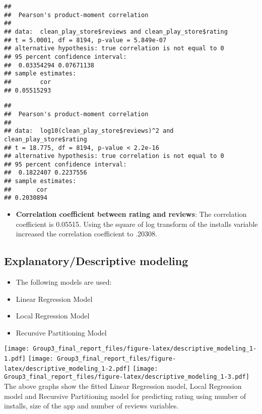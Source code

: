 \documentclass[
]{article}
\providecommand{\tightlist}{%
  \setlength{\itemsep}{0pt}\setlength{\parskip}{0pt}}
\begin{document}
\begin{verbatim}
## 
##  Pearson's product-moment correlation
## 
## data:  clean_play_store$reviews and clean_play_store$rating
## t = 5.0001, df = 8194, p-value = 5.849e-07
## alternative hypothesis: true correlation is not equal to 0
## 95 percent confidence interval:
##  0.03354294 0.07671138
## sample estimates:
##        cor 
## 0.05515293
\end{verbatim}

\begin{verbatim}
## 
##  Pearson's product-moment correlation
## 
## data:  log10(clean_play_store$reviews)^2 and clean_play_store$rating
## t = 18.775, df = 8194, p-value < 2.2e-16
## alternative hypothesis: true correlation is not equal to 0
## 95 percent confidence interval:
##  0.1822407 0.2237556
## sample estimates:
##       cor 
## 0.2030894
\end{verbatim}

\begin{itemize}
\tightlist
\item
  \textbf{Correlation coefficient between rating and reviews}: The
  correlation coefficient is 0.05515. Using the square of log transform
  of the installs variable increased the correlation coefficient to
  .20308.
\end{itemize}

\hypertarget{explanatorydescriptive-modeling}{%
\subsection{Explanatory/Descriptive
modeling}\label{explanatorydescriptive-modeling}}

\begin{itemize}
\tightlist
\item
  The following models are used:
\item
  Linear Regression Model
\item
  Local Regression Model
\item
  Recursive Partitioning Model
\end{itemize}

\texttt{[image: Group3\_final\_report\_files/figure-latex/descriptive\_modeling\_1-1.pdf]}
\texttt{[image: Group3\_final\_report\_files/figure-latex/descriptive\_modeling\_1-2.pdf]}
\texttt{[image: Group3\_final\_report\_files/figure-latex/descriptive\_modeling\_1-3.pdf]}
The above graphs show the fitted Linear Regression model, Local
Regression model and Recursive Partitioning model for predicting rating
using number of installs, size of the app and number of reviews
variables.
\end{document}

